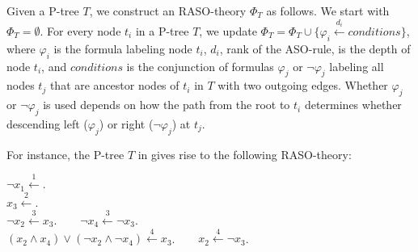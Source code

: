 %

Given a P-tree $T$, we construct an RASO-theory $\Phi_T$ as follows.
We start with $\Phi_T=\emptyset$.
For every node $t_i$ in a P-tree $T$, we update
$\Phi_T=\Phi_T \cup \{\varphi_i \overset{d_i}{\leftarrow} conditions\}$,
where $\varphi_i$ is the formula labeling node $t_i$,
$d_i$, rank of the ASO-rule, is the depth of node $t_i$,
and $conditions$ is the conjunction
of formulas $\varphi_j$ or $\neg \varphi_j$ labeling all nodes $t_j$
that are ancestor nodes of $t_i$ in $T$ with two outgoing edges.
Whether $\varphi_j$ or $\neg \varphi_j$ is used depends on how the path 
from the root to
$t_i$ determines whether descending left ($\varphi_j$) or right ($\neg \varphi_j$)
at $t_j$.

For instance, the P-tree $T$ in  gives rise to the following RASO-theory:

	\begin{framed}
		\noindent $\neg x_1 \overset{1}{\leftarrow}$.  \\%
		$x_3 \overset{2}{\leftarrow}$.\\
		$\neg x_2 \overset{3}{\leftarrow} x_3$.  $\;\;\;\;\;$
		$\neg x_4 \overset{3}{\leftarrow} \neg x_3$.\\
		$(x_2 \land x_4) \lor (\neg x_2 \land \neg x_4) \overset{4}{\leftarrow} x_3$. $\;\;\;\;\;$
		$x_2 \overset{4}{\leftarrow} \neg x_3$.
	\end{framed}

